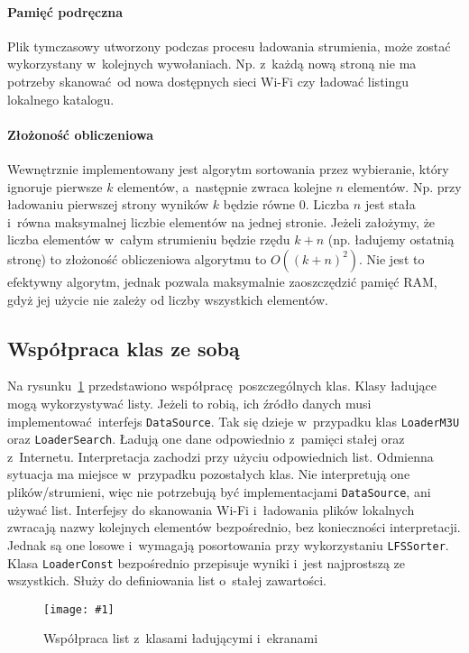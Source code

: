 \documentclass[polish]{aghengthesis}
\newcommand{\imgint}[4]{
	\begin{figure}[{#4}]
		\centering
		\texttt{[image: \#1]}
		\caption{#2}
		\label{#1}
	\end{figure}
}
\newcommand{\imgh}[3]{\imgint{#1}{#2}{#3}{H}}
\begin{document}
			\paragraph{Pamięć podręczna}
			Plik tymczasowy utworzony podczas procesu ładowania strumienia, może zostać wykorzystany w~kolejnych wywołaniach. Np. z~każdą nową stroną nie ma potrzeby skanować od nowa dostępnych sieci Wi-Fi czy ładować listingu lokalnego katalogu.
						
			\paragraph{Złożoność obliczeniowa}
			Wewnętrznie implementowany jest algorytm sortowania przez wybieranie, który ignoruje pierwsze $k$ elementów, a~następnie zwraca kolejne $n$ elementów. Np. przy ładowaniu pierwszej strony wyników $k$ będzie równe 0. Liczba $n$ jest stała i~równa maksymalnej liczbie elementów na jednej stronie. Jeżeli założymy, że liczba elementów w~całym strumieniu będzie rzędu $k+n$ (np. ładujemy ostatnią stronę) to złożoność obliczeniowa algorytmu to $O((k+n)^2)$. Nie jest to efektywny algorytm, jednak pozwala maksymalnie zaoszczędzić pamięć RAM, gdyż jej użycie nie zależy od liczby wszystkich elementów.
			

		\subsection{Współpraca klas ze sobą}
			Na rysunku~\ref{3/PicoRadio-loaders} przedstawiono współpracę poszczególnych klas. Klasy ładujące mogą wykorzystywać listy. Jeżeli to robią, ich źródło danych musi implementować interfejs \lstinline|DataSource|. Tak się dzieje w~przypadku klas \lstinline|LoaderM3U| oraz \lstinline|LoaderSearch|. Ładują one dane odpowiednio z~pamięci stałej oraz z~Internetu. Interpretacja zachodzi przy użyciu odpowiednich list. Odmienna sytuacja ma miejsce w~przypadku pozostałych klas. Nie interpretują one plików/strumieni, więc nie potrzebują być implementacjami \lstinline|DataSource|, ani używać list. Interfejsy do skanowania Wi-Fi i~ładowania plików lokalnych zwracają nazwy kolejnych elementów bezpośrednio, bez konieczności interpretacji. Jednak są one losowe i~wymagają posortowania przy wykorzystaniu \lstinline|LFSSorter|. Klasa \lstinline|LoaderConst| bezpośrednio przepisuje wyniki i~jest najprostszą ze wszystkich. Służy do definiowania list o~stałej zawartości.
			
			\imgh{3/PicoRadio-loaders}{Współpraca list z~klasami ładującymi i~ekranami}{0.95}
			
\end{document}
